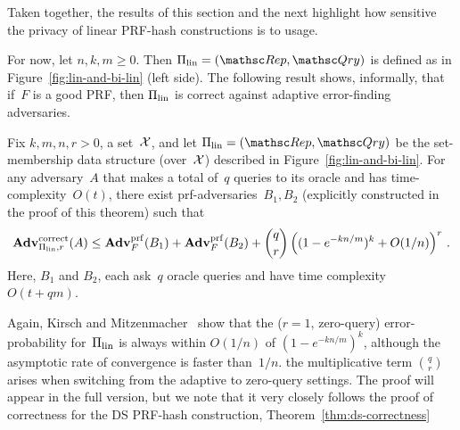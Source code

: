 Taken together, the results of this section and the next highlight how sensitive the privacy of linear PRF-hash constructions is to usage.


For now, let $n,k,m \geq 0$.  Then $\setprim_{\mathrm{lin}}= (\Rep, \Qry)$ is defined as in Figure~\ref{fig:lin-and-bi-lin} (left side).  The following result shows, informally, that if~$F$ is a good PRF, then $\Pi_{\mathrm{lin}}$ is correct against adaptive error-finding adversaries.

\begin{theorem}\label{thm1}\label{thm:lin-correctness}
Fix $k,m,n,r>0$, a set~${\cal X}$, and let $\setprim_{\mathrm{lin}}= (\Rep, \Qry)$ be the set-membership data structure (over~${\cal X}$) described in Figure~\ref{fig:lin-and-bi-lin}.  For any adversary~$A$ that makes a total of~$q$ queries to its oracle and has time-complexity~$O(t)$, there exist prf-adversaries~$B_1,B_2$ (explicitly constructed in the proof of this theorem) such that
\[
\mathrm{\mathbf{Adv}}^{\mathrm{correct}}_{\Pi_{\mathrm{lin}},r}(A) \leq  \mathbf{Adv}^{\mathrm{prf}}_{F}(B_1) + \mathbf{Adv}^{\mathrm{prf}}_{F}(B_2)  +{\dbinom{q}{r}} \left( (1-e^{-kn/m})^k + O(1/n) \right)^r\,.
\]
Here, $B_1$ and $B_2$, each ask~$q$ oracle queries and have time complexity~$O(t+qm)$.
\end{theorem}
Again, Kirsch and Mitzenmacher~\cite{kirsch2006less} show
that the ($r=1$, zero-query) error-probability for~$\Pi_\mathrm{lin}$ is
always within $O(1/n)$ of $(1-e^{-kn/m})^k$, although the asymptotic
rate of convergence is faster than~$1/n$.
the multiplicative term $\binom{q}{r}$ arises when switching from the adaptive to zero-query settings.
The proof will appear in the full version, but we note that it very
closely follows the proof of correctness for the DS PRF-hash
construction, Theorem~\ref{thm:ds-correctness}
%



